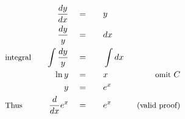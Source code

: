 \begin{alignat*}{5}
&\,&\frac{dy}{dx}\quad&=\quad&&y\\
&\,&\frac{dy}{y}\quad&=&&dx\\
&\small\text{integral}\quad&\int\frac{dy}{y}\quad&=&&\int{dx}\\
&\,&\ln{y}\quad&=&&x\qquad&\small\text{omit}~C\\
&\,&y\quad&=&&e^x\\
&\small\text{Thus}&\frac{d}{dx}e^x\quad&=&&e^x\qquad&\small\text{(valid proof)}
\end{alignat*}
